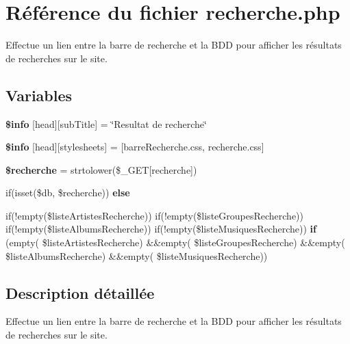 \hypertarget{recherche_8php}{}\section{Référence du fichier recherche.\+php}
\label{recherche_8php}


Effectue un lien entre la barre de recherche et la B\+DD pour afficher les résultats de recherches sur le site.  


\subsection*{Variables}
\begin{DoxyCompactItemize}
\item 
\mbox{\label{recherche_8php_a024f87f9bf4f3b33710e2e7ff8f60823}} 
{\bfseries \$info} \mbox{[}\textquotesingle{}head\textquotesingle{}\mbox{]}\mbox{[}\textquotesingle{}sub\+Title\textquotesingle{}\mbox{]} = \char`\"{}Resultat de recherche\char`\"{}
\item 
\mbox{\label{recherche_8php_af6044c8bf78ebc8c58057e14d7738bbd}} 
{\bfseries \$info} \mbox{[}\textquotesingle{}head\textquotesingle{}\mbox{]}\mbox{[}\textquotesingle{}stylesheets\textquotesingle{}\mbox{]} = \mbox{[}\textquotesingle{}barre\+Recherche.\+css\textquotesingle{}, \textquotesingle{}recherche.\+css\textquotesingle{}\mbox{]}
\item 
\mbox{\label{recherche_8php_abf987b642f3fa7f12bf8fcbcbbd43d99}} 
{\bfseries \$recherche} = strtolower(\$\+\_\+\+G\+ET\mbox{[}\textquotesingle{}recherche\textquotesingle{}\mbox{]})
\item 
if(isset(\$db, \$recherche)) {\bfseries else}
\item 
\mbox{\label{recherche_8php_a5f354a5d808c208f9c63f0dc363f535a}} 
if(!empty(\$liste\+Artistes\+Recherche)) if(!empty(\$liste\+Groupes\+Recherche)) if(!empty(\$liste\+Albums\+Recherche)) if(!empty(\$liste\+Musiques\+Recherche)) {\bfseries if} (empty( \$liste\+Artistes\+Recherche) \&\&empty( \$liste\+Groupes\+Recherche) \&\&empty( \$liste\+Albums\+Recherche) \&\&empty( \$liste\+Musiques\+Recherche))
\end{DoxyCompactItemize}


\subsection{Description détaillée}
Effectue un lien entre la barre de recherche et la B\+DD pour afficher les résultats de recherches sur le site. 



